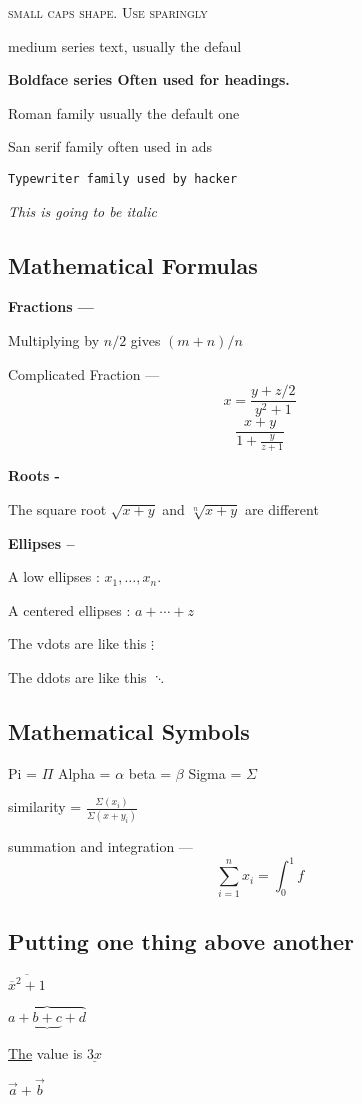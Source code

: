 \documentclass[twocolumn]{article}
\begin{document}
\textsc{small caps shape. Use sparingly}

\textmd {medium series text, usually the defaul}

\textbf {Boldface series Often used for headings.}

\textrm {Roman family usually the default one}

\textsf {San serif family often used in ads}

\texttt {Typewriter family used by hacker}

\textit{This is going to be italic}

\subsection {Mathematical Formulas}

\textbf {Fractions ---}

Multiplying by  $ n/2 $ gives $(m+n)/n$

Complicated Fraction --- \[ x = \frac{y + z/2}{y ^ {2} +1}\]
\[\frac{x+y}{1 + \frac{y}{z+1}}\]

\textbf {Roots -}

The square root $ \sqrt{x+y}$ and $\sqrt[n]{x+y} $ are different

\textbf {Ellipses --}

A low ellipses : $x_{1}, \ldots , x_{n}$.

A centered ellipses : $ a + \cdots + z $

The vdots are like this $ \vdots $

The ddots are like this $ \ddots $

\subsection {Mathematical Symbols}

Pi = $\Pi$
Alpha = $\alpha$
beta = $\beta$
Sigma = $\Sigma$

similarity = $ \frac{\Sigma (x_{i})} { \Sigma (x + y_{i})}$

summation and integration --- \[\sum_{i=1}^{n} x_{i} =  \int_{0}^{1}f \]

\subsection{Putting one thing above another}

\( \overline{\overline{x}^2 + 1} \)

$\overbrace{a+ \underbrace{b+c}+d}$

\underline{The} value is $\underline{3x}$

\( \vec{a} + \vec{b} \)
\end{document}
